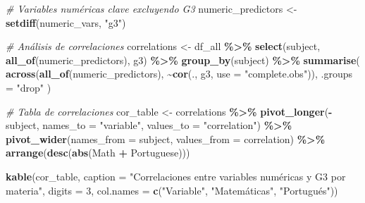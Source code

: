 \documentclass[
]{book}
\newenvironment{Shaded}{\begin{snugshade}}{\end{snugshade}}
\newcommand{\AttributeTok}[1]{\textcolor[rgb]{0.13,0.29,0.53}{#1}}
\newcommand{\CommentTok}[1]{\textcolor[rgb]{0.56,0.35,0.01}{\textit{#1}}}
\newcommand{\DecValTok}[1]{\textcolor[rgb]{0.00,0.00,0.81}{#1}}
\newcommand{\FunctionTok}[1]{\textcolor[rgb]{0.13,0.29,0.53}{\textbf{#1}}}
\newcommand{\NormalTok}[1]{#1}
\newcommand{\OtherTok}[1]{\textcolor[rgb]{0.56,0.35,0.01}{#1}}
\newcommand{\SpecialCharTok}[1]{\textcolor[rgb]{0.81,0.36,0.00}{\textbf{#1}}}
\newcommand{\StringTok}[1]{\textcolor[rgb]{0.31,0.60,0.02}{#1}}
\begin{document}
\begin{Shaded}
\begin{Highlighting}[]
\CommentTok{\# Variables numéricas clave excluyendo G3}
\NormalTok{numeric\_predictors }\OtherTok{\textless{}{-}} \FunctionTok{setdiff}\NormalTok{(numeric\_vars, }\StringTok{"g3"}\NormalTok{)}

\CommentTok{\# Análisis de correlaciones}
\NormalTok{correlations }\OtherTok{\textless{}{-}}\NormalTok{ df\_all }\SpecialCharTok{\%\textgreater{}\%}
  \FunctionTok{select}\NormalTok{(subject, }\FunctionTok{all\_of}\NormalTok{(numeric\_predictors), g3) }\SpecialCharTok{\%\textgreater{}\%}
  \FunctionTok{group\_by}\NormalTok{(subject) }\SpecialCharTok{\%\textgreater{}\%}
  \FunctionTok{summarise}\NormalTok{(}
    \FunctionTok{across}\NormalTok{(}\FunctionTok{all\_of}\NormalTok{(numeric\_predictors), }\SpecialCharTok{\textasciitilde{}}\FunctionTok{cor}\NormalTok{(., g3, }\AttributeTok{use =} \StringTok{"complete.obs"}\NormalTok{)),}
    \AttributeTok{.groups =} \StringTok{"drop"}
\NormalTok{  )}

\CommentTok{\# Tabla de correlaciones}
\NormalTok{cor\_table }\OtherTok{\textless{}{-}}\NormalTok{ correlations }\SpecialCharTok{\%\textgreater{}\%}
  \FunctionTok{pivot\_longer}\NormalTok{(}\SpecialCharTok{{-}}\NormalTok{subject, }\AttributeTok{names\_to =} \StringTok{"variable"}\NormalTok{, }\AttributeTok{values\_to =} \StringTok{"correlation"}\NormalTok{) }\SpecialCharTok{\%\textgreater{}\%}
  \FunctionTok{pivot\_wider}\NormalTok{(}\AttributeTok{names\_from =}\NormalTok{ subject, }\AttributeTok{values\_from =}\NormalTok{ correlation) }\SpecialCharTok{\%\textgreater{}\%}
  \FunctionTok{arrange}\NormalTok{(}\FunctionTok{desc}\NormalTok{(}\FunctionTok{abs}\NormalTok{(Math }\SpecialCharTok{+}\NormalTok{ Portuguese)))}

\FunctionTok{kable}\NormalTok{(cor\_table, }
      \AttributeTok{caption =} \StringTok{"Correlaciones entre variables numéricas y G3 por materia"}\NormalTok{,}
      \AttributeTok{digits =} \DecValTok{3}\NormalTok{,}
      \AttributeTok{col.names =} \FunctionTok{c}\NormalTok{(}\StringTok{"Variable"}\NormalTok{, }\StringTok{"Matemáticas"}\NormalTok{, }\StringTok{"Portugués"}\NormalTok{))}
\end{Highlighting}
\end{Shaded}
\end{document}
